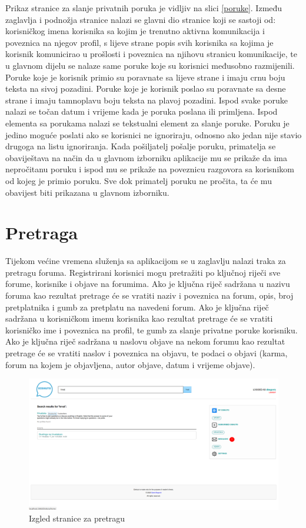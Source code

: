 \documentclass{foi}
\begin{document}
Prikaz stranice za slanje privatnih poruka je vidljiv na slici \ref{poruke}. Između zaglavlja i podnožja stranice nalazi se glavni dio stranice koji se sastoji od: korisničkog imena korisnika sa kojim je trenutno aktivna komunikacija i poveznica na njegov profil, s lijeve strane popis svih korisnika sa kojima je korisnik komunicirao u prošlosti i poveznica na njihovu stranicu komunikacije, te u glavnom dijelu se nalaze same poruke koje su korisnici međusobno razmijenili. Poruke koje je korisnik primio su poravnate sa lijeve strane i imaju crnu boju teksta na sivoj pozadini. Poruke koje je korisnik poslao su poravnate sa desne strane i imaju tamnoplavu boju teksta na plavoj pozadini. Ispod svake poruke nalazi se točan datum i vrijeme kada je poruka poslana ili primljena. Ispod elementa sa porukama nalazi se tekstualni element za slanje poruke. Poruku je jedino moguće poslati ako se korisnici ne ignoriraju, odnosno ako jedan nije stavio drugoga na listu ignoriranja. Kada pošiljatelj pošalje poruku, primatelja se obaviještava na način da u glavnom izborniku aplikacije mu se prikaže da ima nepročitanu poruku i ispod mu se prikaže na poveznicu razgovora sa korisnikom od kojeg je primio poruku. Sve dok primatelj poruku ne pročita, ta će mu obavijest biti prikazana u glavnom izborniku.

\section{Pretraga}

Tijekom većine vremena služenja sa aplikacijom se u zaglavlju nalazi traka za pretragu foruma. Registrirani korisnici mogu pretražiti po ključnoj riječi sve forume, korisnike i objave na forumima. Ako je ključna riječ sadržana u nazivu foruma kao rezultat pretrage će se vratiti naziv i poveznica na forum, opis, broj pretplatnika i gumb za pretplatu na navedeni forum. Ako je ključna riječ sadržana u korisničkom imenu korisnika kao rezultat pretrage će se vratiti korisničko ime i poveznica na profil, te gumb za slanje privatne poruke korisniku. Ako je ključna riječ sadržana u naslovu objave na nekom forumu kao rezultat pretrage će se vratiti naslov i poveznica na objavu, te podaci o objavi (karma, forum na kojem je objavljena, autor objave, datum i vrijeme objave).

\begin{figure}[h!]
    \centering
    \includegraphics[width=1\textwidth]{slike/pretraga.png}
    \caption{Izgled stranice za pretragu}
    \label{pretraga}
\end{figure}
\end{document}
